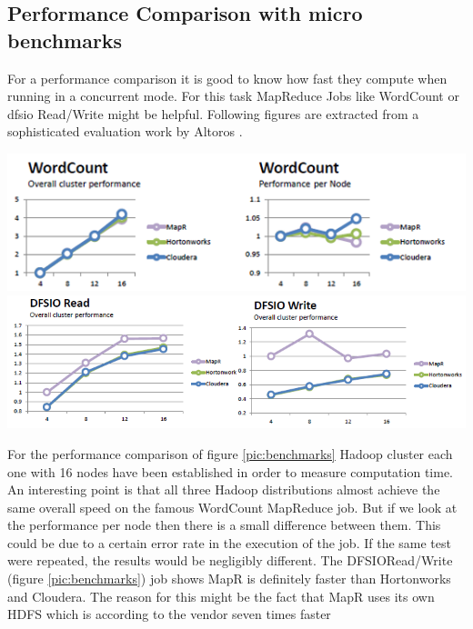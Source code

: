 \documentclass[12pt]{article}
\begin{document}
\subsection{Performance Comparison with micro benchmarks}
For a performance comparison it is good to know how fast they compute when running in a
concurrent mode. For this task MapReduce Jobs like WordCount or \ac{dfsio} Read/Write might be helpful. Following figures are extracted from a sophisticated evaluation work by Altoros \citep{altoros}.
\begin{center}
\includegraphics[width=1.0\textwidth]{img/bench1}
\vspace{0.1cm}
\includegraphics[width=1.0\textwidth]{img/bench2}
\label{pic:benchmarks}
\end{center}
For the performance comparison of figure \ref{pic:benchmarks} Hadoop cluster each one with 16 nodes have been established in order to measure computation time. An interesting point is that all three Hadoop distributions almost achieve the same overall speed on the famous WordCount MapReduce job. But if we look at the performance per node then there is a small difference between them. This could be due to a certain error rate in the execution of the job. If the same test were repeated, the results would be negligibly different. The DFSIORead/Write (figure \ref{pic:benchmarks}) job shows MapR is definitely faster than Hortonworks and Cloudera. The reason for
this might be the fact that MapR uses its own HDFS which is according to the vendor seven times faster
\end{document}
